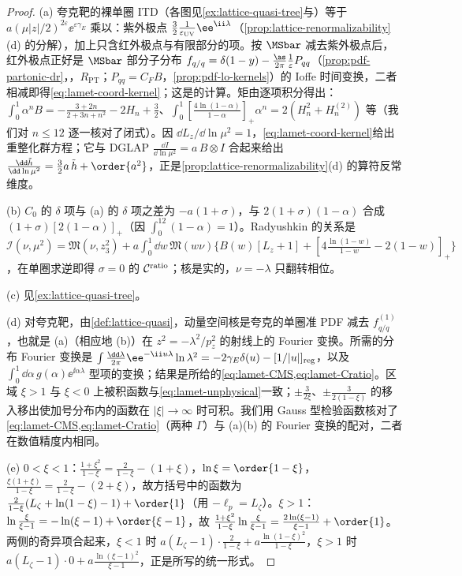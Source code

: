 \begin{proof}
(a) 夸克靶的裸单圈 ITD（各图见\cref{ex:lattice-quasi-tree}与\cite[第~III~节]{IzubuchiEtAl2018}）等于 $a(\mu|z|/2)^{2\varepsilon}\ee^{\varepsilon\gamma_E}$ 乘以：紫外极点 $\frac32\frac1{\varepsilon_{\rm UV}}\ee^{\ii\lambda}$（\cref{prop:lattice-renormalizability}(d) 的分解），加上只含红外极点与有限部分的项。按 $\MSbar$ 减去紫外极点后，红外极点正好是 $\MSbar$ 部分子分布 $f_{q/q}=\delta(1-y)-\frac{\as}{2\pi}\frac1{\varepsilon}P_{qq}$（\cref{prop:pdf-partonic-dr}，\tagR，$R_{\mathrm{PT}}$；$P_{qq}=C_F B$，\cref{prop:pdf-lo-kernels}）的 Ioffe 时间变换，二者相减即得\cref{eq:lamet-coord-kernel}；这是\cite{IzubuchiEtAl2018,Radyushkin:2018cvn,Zhang:2018ggy}的计算。矩由逐项积分得出：$\int_0^1\alpha^nB=-\frac{3+2n}{2+3n+n^2}-2H_n+\frac32$、$\int_0^1[\frac{4\ln(1-\alpha)}{1-\alpha}]_+\alpha^n=2(H_n^2+H_n^{(2)})$ 等（我们对 $n\le12$ 逐一核对了闭式）。因 $\dd L_z/\dd\ln\mu^2=1$，\cref{eq:lamet-coord-kernel}给出重整化群方程；它与 DGLAP $\frac{\dd I}{\dd\ln\mu^2}=a\,B\otimes I$ 合起来给出 $\frac{\dd\tilde h}{\dd\ln\mu^2}=\frac32a\,\tilde h+\order{a^2}$，正是\cref{prop:lattice-renormalizability}(d) 的算符反常维度。

(b) $C_0$ 的 $\delta$ 项与 (a) 的 $\delta$ 项之差为 $-a(1+\sigma)$，与 $2(1+\sigma)(1-\alpha)$ 合成 $(1+\sigma)[2(1-\alpha)]_+$（因 $\int_0^12(1-\alpha)=1$）。Radyushkin 的关系\cite{Radyushkin:2018cvn}是 $\mathcal I(\nu,\mu^2)=\mathfrak M(\nu,z_3^2)+a\int_0^1\dd w\,\mathfrak M(w\nu)\{B(w)[L_z+1]+[4\frac{\ln(1-w)}{1-w}-2(1-w)]_+\}$，在单圈求逆即得 $\sigma=0$ 的 $\mathcal C^{\rm ratio}$；核是实的，$\nu=-\lambda$ 只翻转相位。

(c) 见\cref{ex:lattice-quasi-tree}。

(d) 对夸克靶，由\cref{def:lattice-quasi}，动量空间核是夸克的单圈准 PDF 减去 $f^{(1)}_{q/q}$，也就是 (a)（相应地 (b)）在 $z^2=-\lambda^2/p_z^2$ 的射线上的 Fourier 变换。所需的分布 Fourier 变换是 $\int\frac{\dd\lambda}{2\pi}\ee^{-\ii u\lambda}\ln\lambda^2=-2\gamma_E\delta(u)-[1/|u|]_{\rm reg}$，以及 $\int_0^1\dd\alpha\,g(\alpha)\ee^{\ii\alpha\lambda}$ 型项的变换；结果是\cite[第~III~节]{IzubuchiEtAl2018}所给的\cref{eq:lamet-CMS,eq:lamet-Cratio}。区域 $\xi>1$ 与 $\xi<0$ 上被积函数与\cref{eq:lamet-unphysical}一致；$\pm\frac3{2\xi}$、$\pm\frac3{2(1-\xi)}$ 的移入移出使加号分布内的函数在 $|\xi|\to\infty$ 时可积。我们用 Gauss 型检验函数核对了\cref{eq:lamet-CMS,eq:lamet-Cratio}（两种 $\Gamma$）与 (a)(b) 的 Fourier 变换的配对，二者在数值精度内相同。

(e) $0<\xi<1$：$\frac{1+\xi^2}{1-\xi}=\frac2{1-\xi}-(1+\xi)$，$\ln\xi=\order{1-\xi}$，$\frac{\xi(1+\xi)}{1-\xi}=\frac2{1-\xi}-(2+\xi)$，故方括号中的函数为 $\frac2{1-\xi}(L_\zeta+\ln(1-\xi)-1)+\order{1}$（用 $-\ell_p=L_\zeta$）。$\xi>1$：$\ln\frac\xi{\xi-1}=-\ln(\xi-1)+\order{\xi-1}$，故 $\frac{1+\xi^2}{1-\xi}\ln\frac\xi{\xi-1}=\frac{2\ln(\xi-1)}{\xi-1}+\order{1}$。两侧的奇异项合起来，$\xi<1$ 时 $a(L_\zeta-1)\cdot\frac2{1-\xi}+a\frac{\ln(1-\xi)^2}{1-\xi}$，$\xi>1$ 时 $a(L_\zeta-1)\cdot0+a\frac{\ln(\xi-1)^2}{\xi-1}$，正是所写的统一形式。


\end{proof}
